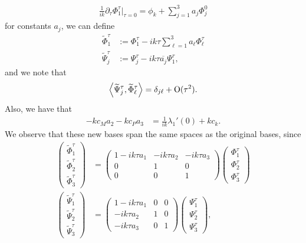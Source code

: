 \documentclass[11pt,leqno]{article}
\numberwithin{equation}{section}
\theoremstyle{definition}
\begin{document}
\begin{align*}
	\frac{1}{ik}\partial_{\tau}\Phi_{1}^{\tau}\bigg|_{\tau = 0} = \phi_{k} + \sum_{j = 1}^{3}a_{j}\Phi_{j}^{0}
\end{align*}
for constants $ a_{j} $, we can define
\begin{align*}
	\widetilde{\Phi}_{1}^{\tau} &:= \Phi_{1}^{\tau} - ik\tau\sum_{\ell = 1}^{3}a_{\ell}\Phi_{\ell}^{\tau}\\
	\widetilde{\Psi}_{j}^{\tau} &:= \Psi_{j}^{\tau} - ik\tau \overline{a_{j}}\Psi_{1}^{\tau},
\end{align*}
and we note that
\begin{align}
	\left\langle\widetilde{\Psi}_{j}^{\tau},\widetilde{\Phi}_{\ell}^{\tau} \right\rangle = \delta_{j\ell} + \rm O(\tau^{2}).\label{eq:newbasesortho}
\end{align}
Also, we have that
\begin{align*}
	-kc_{M}a_{2} - kc_{P}a_{3} &= \frac{1}{ik}\lambda_{1}'(0) + kc_{k}.
\end{align*}
We observe that these new bases span the same spaces as the original bases, since
\begin{align*}
	\begin{pmatrix}
		\widetilde{\Phi}_{1}^{\tau}\\\widetilde{\Phi}_{2}^{\tau}\\\widetilde{\Phi}_{3}^{\tau}
	\end{pmatrix}
	&= \begin{pmatrix}
		1 - ik\tau a_{1} & -ik\tau a_{2} & -ik\tau a_{3}\\
		0 & 1 & 0\\
		0 & 0 & 1
	\end{pmatrix}
	\begin{pmatrix}
		\Phi_{1}^{\tau}\\\Phi_{2}^{\tau}\\\Phi_{3}^{\tau}
	\end{pmatrix}\\
	\begin{pmatrix}
		\widetilde{\Psi}_{1}^{\tau}\\\widetilde{\Psi}_{2}^{\tau}\\\widetilde{\Psi}_{3}^{\tau}
	\end{pmatrix}
	&= \begin{pmatrix}
		1 - ik\tau a_{1} & 0 & 0\\
		-ik\tau a_{2} & 1 & 0\\
		-ik\tau a_{3} & 0 & 1
	\end{pmatrix}
	\begin{pmatrix}
		\Psi_{1}^{\tau}\\\Psi_{2}^{\tau}\\\Psi_{3}^{\tau}
	\end{pmatrix},
\end{align*}
\end{document}
